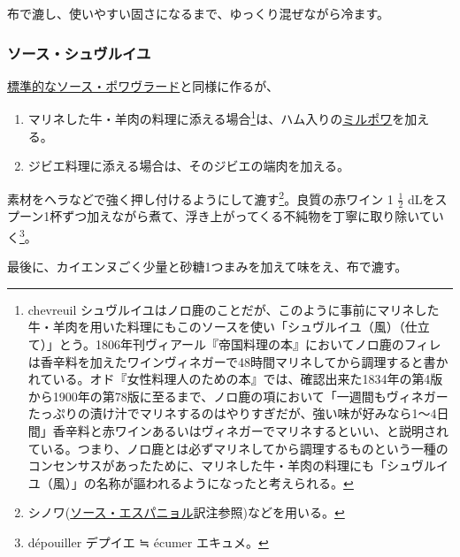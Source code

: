 \begin{recette}
布で漉し、使いやすい固さになるまで、ゆっくり混ぜながら冷ます。

\hypertarget{sauce-chevreuil}{%
\subsubsection{ソース・シュヴルイユ}\label{sauce-chevreuil}}



\protect\hyperlink{sauce-poivrade}{標準的なソース・ポワヴラード}と同様に作るが、

\begin{enumerate}
\def\labelenumi{\arabic{enumi}.}
\item
  マリネした牛・羊肉の料理に添える場合\footnote{chevreuil
    シュヴルイユはノロ鹿のことだが、このように事前にマリネした牛・羊肉を用いた料理にもこのソースを使い「シュヴルイユ（風）（仕立て）」とう。1806年刊ヴィアール『帝国料理の本』においてノロ鹿のフィレは香辛料を加えたワインヴィネガーで48時間マリネしてから調理すると書かれている。オド『女性料理人のための本』では、確認出来た1834年の第4版から1900年の第78版に至るまで、ノロ鹿の項において「一週間もヴィネガーたっぷりの漬け汁でマリネするのはやりすぎだが、強い味が好みなら1〜4日間」香辛料と赤ワインあるいはヴィネガーでマリネするといい、と説明されている。つまり、ノロ鹿とは必ずマリネしてから調理するものという一種のコンセンサスがあったために、マリネした牛・羊肉の料理にも「シュヴルイユ（風）」の名称が謳われるようになったと考えられる。}は、ハム入りの\protect\hyperlink{mirepoix}{ミルポワ}を加える。
\item
  ジビエ料理に添える場合は、そのジビエの端肉を加える。
\end{enumerate}

素材をヘラなどで強く押し付けるようにして漉す\footnote{シノワ(\protect\hyperlink{sauce-espagnole}{ソース・エスパニョル}訳注参照)などを用いる。}。良質の赤ワイン
1 \(\frac{1}{2}\)
dLをスプーン1杯ずつ加えながら煮て、浮き上がってくる不純物を丁寧に取り除いていく\footnote{dépouiller
  デプイエ ≒ écumer エキュメ。}。

最後に、カイエンヌごく少量と砂糖1つまみを加えて味をえ、布で漉す。

\hypertarget{sauce-colbert}{%
}
\end{recette}
